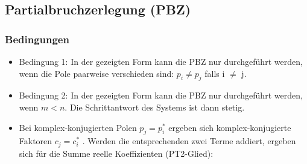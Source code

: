 \subsection{Partialbruchzerlegung (PBZ)  }
\subsubsection{Bedingungen}
\begin{itemize}
\item Bedingung 1: In der gezeigten Form kann die PBZ nur durchgeführt werden,
wenn die Pole paarweise verschieden sind: $p_{i} \neq p_{j}$ falls i $\neq$ j.
\item Bedingung 2: In der gezeigten Form kann die PBZ nur durchgeführt werden, wenn $m < n$. Die Schrittantwort des Systems ist dann stetig.
\item Bei komplex-konjugierten Polen $p_{j} = p^{\ast}_{i}$ ergeben sich komplex-konjugierte Faktoren
$c_{j} = c^{\ast}_{i}$ . Werden die entsprechenden zwei Terme addiert, ergeben sich
für die Summe reelle Koeffizienten (PT2-Glied):
\end{itemize}
